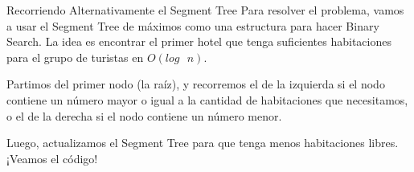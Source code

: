 \documentclass{beamer}
\begin{document}
\begin{frame}{Recorriendo Alternativamente el Segment Tree}
Para resolver el problema, vamos a usar el Segment Tree de máximos como una estructura para hacer Binary Search. La idea es encontrar el primer hotel que tenga suficientes habitaciones para el grupo de turistas en $O(log \text{ } n)$.

\pause
Partimos del primer nodo (la raíz), y recorremos el de la izquierda si el nodo contiene un número mayor o igual a la cantidad de habitaciones que necesitamos, o el de la derecha si el nodo contiene un número menor.

\pause
Luego, actualizamos el Segment Tree para que tenga menos habitaciones libres. ¡Veamos el código!
\end{frame}
\end{document}
